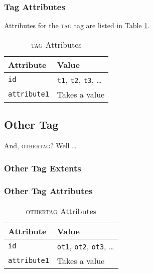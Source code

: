 \documentclass[11pt]{article}
\begin{document}
\subsubsection{Tag Attributes} %
\label{ssub:tag_attributes}
Attributes for the \textsc{tag} tag are listed in Table \ref{tab:tag}.

\begin{table}[h]
\begin{center}
\begin{tabular}{|l|l|}
    \hline \textbf{Attribute}   & \textbf{Value}\\
    \hline \texttt{id}          & \texttt{t1}, \texttt{t2}, \texttt{t3}, \ldots\\
    \hline \texttt{attribute1}  & Takes a value\\
    \hline
\end{tabular}
\caption{\textsc{tag} Attributes}
\label{tab:tag}
\end{center}
\end{table}

\subsection{Other Tag} %
\label{sub:other_tag}
And, \textsc{othertag}? Well \ldots

\subsubsection{Other Tag Extents} %
\label{ssub:other_tag_extents}


\subsubsection{Other Tag Attributes} %

\label{ssub:other_tag_attributes}
\begin{table}[h]
\begin{center}
\begin{tabular}{|l|l|}
    \hline \textbf{Attribute}   & \textbf{Value}\\
    \hline \texttt{id}          & \texttt{ot1}, \texttt{ot2}, \texttt{ot3}, \ldots\\
    \hline \texttt{attribute1}  & Takes a value\\
    \hline
\end{tabular}
\caption{\textsc{othertag} Attributes}
\label{tab:othertag}
\end{center}
\end{table}
\end{document}
